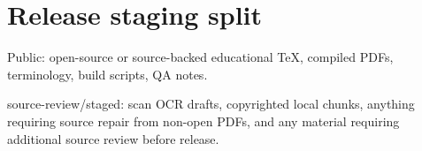 \section{Release staging split}

Public: open-source or source-backed educational TeX, compiled PDFs, terminology, build scripts, QA notes.

source-review/staged: scan OCR drafts, copyrighted local chunks, anything requiring source repair from non-open PDFs, and any material requiring additional source review before release.

